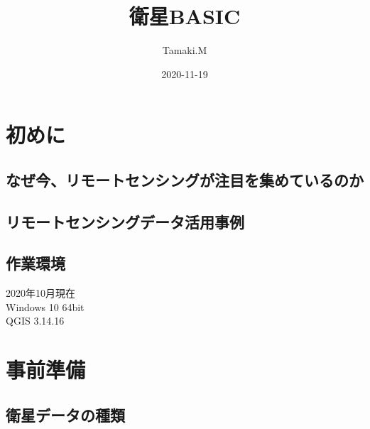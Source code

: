 \documentclass[
]{book}
\title{衛星BASIC}
\author{Tamaki.M}
\date{2020-11-19}
\begin{document}
\maketitle

{
\setcounter{tocdepth}{1}
\tableofcontents
}
\hypertarget{ux521dux3081ux306b}{%
\chapter*{初めに}\label{ux521dux3081ux306b}}

\hypertarget{ux306aux305cux4ecaux30eaux30e2ux30fcux30c8ux30bbux30f3ux30b7ux30f3ux30b0ux304cux6ce8ux76eeux3092ux96c6ux3081ux3066ux3044ux308bux306eux304b}{%
\section{なぜ今、リモートセンシングが注目を集めているのか}\label{ux306aux305cux4ecaux30eaux30e2ux30fcux30c8ux30bbux30f3ux30b7ux30f3ux30b0ux304cux6ce8ux76eeux3092ux96c6ux3081ux3066ux3044ux308bux306eux304b}}

\hypertarget{ux30eaux30e2ux30fcux30c8ux30bbux30f3ux30b7ux30f3ux30b0ux30c7ux30fcux30bfux6d3bux7528ux4e8bux4f8b}{%
\section{リモートセンシングデータ活用事例}\label{ux30eaux30e2ux30fcux30c8ux30bbux30f3ux30b7ux30f3ux30b0ux30c7ux30fcux30bfux6d3bux7528ux4e8bux4f8b}}

\hypertarget{ux4f5cux696dux74b0ux5883}{%
\section{作業環境}\label{ux4f5cux696dux74b0ux5883}}

2020年10月現在\\
Windows 10 64bit\\
QGIS 3.14.16

\hypertarget{ux4e8bux524dux6e96ux5099}{%
\chapter{事前準備}\label{ux4e8bux524dux6e96ux5099}}

\hypertarget{ux885bux661fux30c7ux30fcux30bfux306eux7a2eux985e}{%
\section{衛星データの種類}\label{ux885bux661fux30c7ux30fcux30bfux306eux7a2eux985e}}
\end{document}
